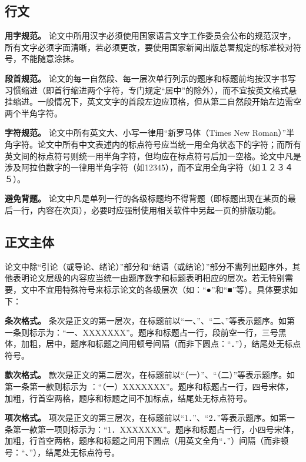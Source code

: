 \documentclass[singlesided]{Style/ucasthesis}%
\begin{document}
\hypertarget{section-24}{%
\subsection{行文}\label{section-24}}

\textbf{用字规范。} 论文中所用汉字必须使用国家语言文字工作委员会公布的规范汉字，所有文字必须字面清晰，若必须更改，要使用国家新闻出版总署规定的标准校对符号，不能随意涂抺。

\textbf{段首规范。} 论文的每一自然段、每一层次单行列示的题序和标题前均按汉字书写习惯缩进（即首行缩进两个字符，专门规定``居中''的除外），而不宜按英文格式悬挂缩进。一般情况下，英文文字的首段左边应顶格，但从第二自然段开始左边需空两个半角字符。

\textbf{字符规范。} 论文中所有英文大、小写一律用``新罗马体（Times New Roman）''半角字符。论文中所有中文表述内的标点符号应当统一用全角状态下的字符；而所有英文间的标点符号则统一用半角字符，但均应在标点符号后加一空格。论文中凡是涉及阿拉伯数字的一律用半角字符（如12345），而不宜用全角字符（如１２３４５）。

\textbf{避免背题。} 论文中凡是单列一行的各级标题均不得背题（即标题出现在某页的最后一行，内容在次页），必要时应强制使用相关软件中另起一页的排版功能。

\hypertarget{section-25}{%
\subsection{正文主体}\label{section-25}}

论文中除``引论（或导论、绪论）''部分和``结语（或结论）''部分不需列出题序外，其他表明论文层级的内容应当统一由题序数字和标题表明相应的层次。若无特别需要，文中不宜用特殊符号来标示论文的各级层次（如：``●''和``■''等）。具体要求如下：

\textbf{条次格式。} 条次是正文的第一层次，在标题前以``一、''、``二、''等表示题序。如第一条则标示为：``一、XXXXXXX''。题序和标题占一行，段前空一行，三号黑体，加粗，居中，题序和标题之间用顿号间隔（而非下圆点：``．''），结尾处无标点符号。

\textbf{款次格式。} 款次是正文的第二层次，在标题前以``（一）''、``（二）''等表示题序。如第一条第一款则标示为 ：``（一）XXXXXXX''。题序和标题占一行，四号宋体，加粗，行首空两格，题序和标题之间不加标点，结尾处无标点符号。

\textbf{项次格式。} 项次是正文的第三层次，在标题前以``1．''、``2．''等表示题序。如第一条第一款第一项则标示为：``1．XXXXXXX''。题序和标题占一行，小四号宋体，加粗，行首空两格，题序和标题之间用下圆点（用英文全角``．''）间隔（而非顿号：``、''），结尾处无标点符号。
\end{document}
